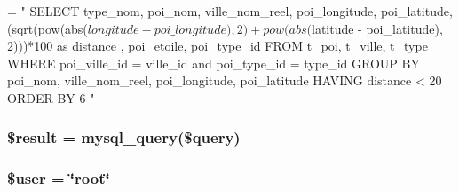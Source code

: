 \begin{DoxyCode}
= \textcolor{stringliteral}{"}
\textcolor{stringliteral}{    SELECT      type\_nom, poi\_nom, ville\_nom\_reel, poi\_longitude, poi\_latitude, }
\textcolor{stringliteral}{                (sqrt(pow(abs($longitude - poi\_longitude),2) + pow(abs($latitude - poi\_latitude), 2)))*100
       as distance , }
\textcolor{stringliteral}{                poi\_etoile, poi\_type\_id}
\textcolor{stringliteral}{    FROM        t\_poi, t\_ville, t\_type}
\textcolor{stringliteral}{    WHERE       poi\_ville\_id = ville\_id and poi\_type\_id = type\_id }
\textcolor{stringliteral}{    GROUP BY    poi\_nom, ville\_nom\_reel, poi\_longitude, poi\_latitude }
\textcolor{stringliteral}{    HAVING      distance < 20}
\textcolor{stringliteral}{    ORDER BY    6}
\textcolor{stringliteral}{"}
\end{DoxyCode}
\hypertarget{nearest_poi_8php_a112ef069ddc0454086e3d1e6d8d55d07}{
\subsubsection[{\$result}]{\setlength{\rightskip}{0pt plus 5cm}\$result = mysql\-\_\-query(\$query)}}\label{nearest_poi_8php_a112ef069ddc0454086e3d1e6d8d55d07}
\hypertarget{nearest_poi_8php_a598ca4e71b15a1313ec95f0df1027ca5}{
\subsubsection[{\$user}]{\setlength{\rightskip}{0pt plus 5cm}\$user = \char`\"{}root\char`\"{}}}\label{nearest_poi_8php_a598ca4e71b15a1313ec95f0df1027ca5}
